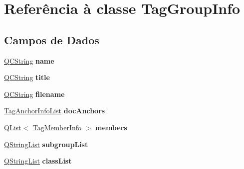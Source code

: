 \hypertarget{class_tag_group_info}{\section{Referência à classe Tag\-Group\-Info}
\label{class_tag_group_info}
}
\subsection*{Campos de Dados}
\begin{DoxyCompactItemize}
\item 
\hypertarget{class_tag_group_info_adc0097c7bd1e61ad32058fcde425bc7a}{\hyperlink{class_q_c_string}{Q\-C\-String} {\bfseries name}}\label{class_tag_group_info_adc0097c7bd1e61ad32058fcde425bc7a}

\item 
\hypertarget{class_tag_group_info_a42bb80709d086df855babb087e63794b}{\hyperlink{class_q_c_string}{Q\-C\-String} {\bfseries title}}\label{class_tag_group_info_a42bb80709d086df855babb087e63794b}

\item 
\hypertarget{class_tag_group_info_a99a47216e8094a3186f3d837ee0b1c25}{\hyperlink{class_q_c_string}{Q\-C\-String} {\bfseries filename}}\label{class_tag_group_info_a99a47216e8094a3186f3d837ee0b1c25}

\item 
\hypertarget{class_tag_group_info_a3a6c53fe1869a01e3748ec5898a54458}{\hyperlink{class_tag_anchor_info_list}{Tag\-Anchor\-Info\-List} {\bfseries doc\-Anchors}}\label{class_tag_group_info_a3a6c53fe1869a01e3748ec5898a54458}

\item 
\hypertarget{class_tag_group_info_acab433535ad1575dfbddf6796d2baf98}{\hyperlink{class_q_list}{Q\-List}$<$ \hyperlink{class_tag_member_info}{Tag\-Member\-Info} $>$ {\bfseries members}}\label{class_tag_group_info_acab433535ad1575dfbddf6796d2baf98}

\item 
\hypertarget{class_tag_group_info_af4b021973a6d2afff0e5632a7c5632fc}{\hyperlink{class_q_string_list}{Q\-String\-List} {\bfseries subgroup\-List}}\label{class_tag_group_info_af4b021973a6d2afff0e5632a7c5632fc}

\item 
\hypertarget{class_tag_group_info_af3bb2d0ed4b98f17279d80fdf29f77cb}{\hyperlink{class_q_string_list}{Q\-String\-List} {\bfseries class\-List}}\label{class_tag_group_info_af3bb2d0ed4b98f17279d80fdf29f77cb}


\end{DoxyCompactItemize}
